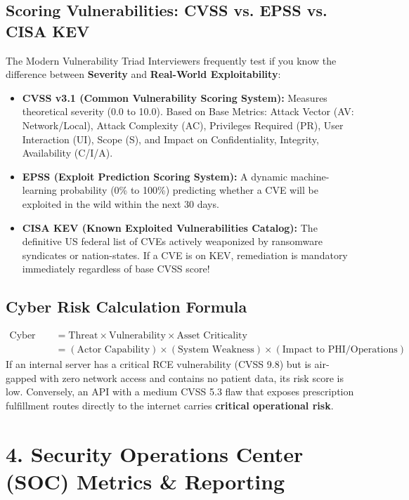 \documentclass[10pt,a4paper]{article}
\begin{document}
\subsection{Scoring Vulnerabilities: CVSS vs. EPSS vs. CISA KEV}
\begin{calloutbox}{The Modern Vulnerability Triad}
Interviewers frequently test if you know the difference between \textbf{Severity} and \textbf{Real-World Exploitability}:
\begin{itemize}[noitemsep]
    \item \textbf{CVSS v3.1 (Common Vulnerability Scoring System):} Measures theoretical severity (0.0 to 10.0). Based on Base Metrics: Attack Vector (AV: Network/Local), Attack Complexity (AC), Privileges Required (PR), User Interaction (UI), Scope (S), and Impact on Confidentiality, Integrity, Availability (C/I/A).
    \item \textbf{EPSS (Exploit Prediction Scoring System):} A dynamic machine-learning probability (0\% to 100\%) predicting whether a CVE will be exploited in the wild within the next 30 days.
    \item \textbf{CISA KEV (Known Exploited Vulnerabilities Catalog):} The definitive US federal list of CVEs actively weaponized by ransomware syndicates or nation-states. If a CVE is on KEV, remediation is mandatory immediately regardless of base CVSS score!
\end{itemize}
\end{calloutbox}

\subsection{Cyber Risk Calculation Formula}
\begin{equation*}
\begin{split}
\text{Cyber Risk} &= \text{Threat} \times \text{Vulnerability} \times \text{Asset Criticality} \\
&= (\text{Actor Capability}) \times (\text{System Weakness}) \times (\text{Impact to PHI/Operations})
\end{split}
\end{equation*}
If an internal server has a critical RCE vulnerability (CVSS 9.8) but is air-gapped with zero network access and contains no patient data, its risk score is low. Conversely, an API with a medium CVSS 5.3 flaw that exposes prescription fulfillment routes directly to the internet carries \textbf{critical operational risk}.

\section{4. Security Operations Center (SOC) Metrics \& Reporting}
\end{document}

